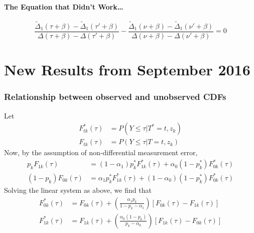\documentclass[12pt]{article}
\begin{document}
 \paragraph{The Equation that Didn't Work\ldots}
\[
  \frac{\widetilde{\Delta}_1(\tau + \beta) - \widetilde{\Delta}_1(\tau' + \beta)}{\Delta(\tau + \beta) - \Delta(\tau' + \beta)}
- \frac{\widetilde{\Delta}_1(\nu + \beta) - \widetilde{\Delta}_1(\nu' + \beta)}{\Delta(\nu + \beta) - \Delta(\nu' + \beta)} = 0
 \]
%


\section{New Results from September 2016}

\subsubsection{Relationship between observed and unobserved CDFs}
Let
\begin{align*}
F^*_{tk}(\tau) &= P(Y \leq \tau|T^*=t, z_k)\\
F_{tk}(\tau) &= P(Y \leq \tau|T=t, z_k)
\end{align*}
Now, by the assumption of non-differential measurement error,
\begin{align*}
  p_k F_{1k}(\tau) &= (1 - \alpha_1) p_k^* F_{1k}^*(\tau) + \alpha_0 (1 - p_k^*)F_{0k}^*(\tau)\\
  (1 - p_k) F_{0k}(\tau) &= \alpha_1 p_k^* F_{1k}^*(\tau) + (1 - \alpha_0) (1 - p_k^*)F_{0k}^*(\tau)
\end{align*}
Solving the linear system as above, we find that
\begin{align*}
  F_{0k}^*(\tau) &= F_{0k}(\tau) + \left( \frac{\alpha_1 p_k}{1 - p_k - \alpha_1} \right)\left[ F_{0k}(\tau) - F_{1k}(\tau) \right]\\
  F_{1k}^*(\tau) &= F_{1k}(\tau) + \left( \frac{\alpha_0 (1-p_k)}{p_k - \alpha_0} \right)\left[ F_{1k}(\tau) - F_{0k}(\tau) \right]\\
\end{align*}
\end{document}
